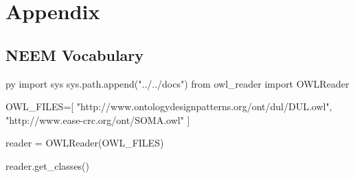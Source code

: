 \chapter{Appendix}
\label{app:complete_pub_list}

\section{NEEM Vocabulary}
\label{appendix:section1}
\pagestyle{fancy} 
\newcommand{\appendixstyle}[2]{\textbf{#1}\markboth{#1}{#1}\ {#2}}

\begin{pythontexcustomcode}{py}
import sys
sys.path.append("../../docs")
from owl_reader import OWLReader

OWL_FILES=[
    "http://www.ontologydesignpatterns.org/ont/dul/DUL.owl",
    "http://www.ease-crc.org/ont/SOMA.owl"
]

reader = OWLReader(OWL_FILES)
\end{pythontexcustomcode}

\raggedright
\begin{multicols}{2}

\begin{pycode}
reader.get_classes()
\end{pycode}

\end{multicols}

